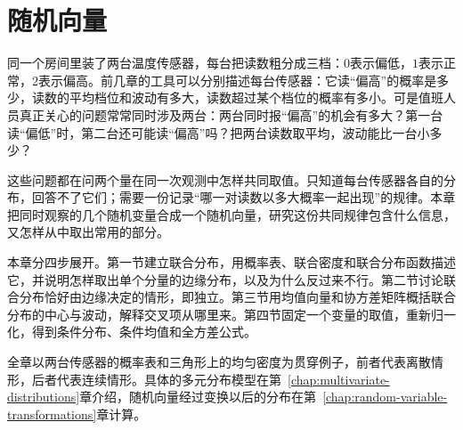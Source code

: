 \chapter{随机向量}
\label{chap:random-vectors}

同一个房间里装了两台温度传感器，每台把读数粗分成三档：$0$表示偏低，$1$表示正常，$2$表示偏高。前几章的工具可以分别描述每台传感器：它读“偏高”的概率是多少，读数的平均档位和波动有多大，读数超过某个档位的概率有多小。可是值班人员真正关心的问题常常同时涉及两台：两台同时报“偏高”的机会有多大？第一台读“偏低”时，第二台还可能读“偏高”吗？把两台读数取平均，波动能比一台小多少？

这些问题都在问两个量在同一次观测中怎样共同取值。只知道每台传感器各自的分布，回答不了它们；需要一份记录“哪一对读数以多大概率一起出现”的规律。本章把同时观察的几个随机变量合成一个随机向量，研究这份共同规律包含什么信息，又怎样从中取出常用的部分。

本章分四步展开。第一节建立联合分布，用概率表、联合密度和联合分布函数描述它，并说明怎样取出单个分量的边缘分布，以及为什么反过来不行。第二节讨论联合分布恰好由边缘决定的情形，即独立。第三节用均值向量和协方差矩阵概括联合分布的中心与波动，解释交叉项从哪里来。第四节固定一个变量的取值，重新归一化，得到条件分布、条件均值和全方差公式。

全章以两台传感器的概率表和三角形上的均匀密度为贯穿例子，前者代表离散情形，后者代表连续情形。具体的多元分布模型在第~\ref{chap:multivariate-distributions}章介绍，随机向量经过变换以后的分布在第~\ref{chap:random-variable-transformations}章计算。










